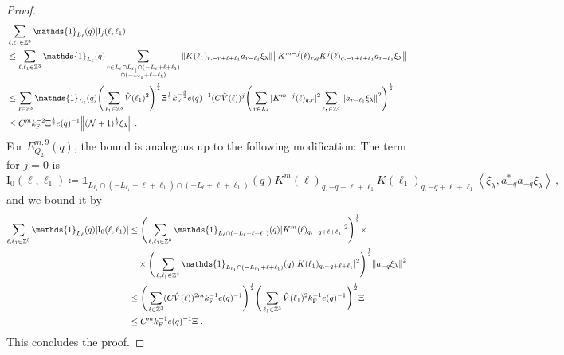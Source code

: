 \documentclass[12pt,a4paper]{article}
\numberwithin{equation}{section}
\newcommand{\1}{\mathbb{I}}
\newcommand{\F}{\mathrm{F}}
\newcommand{\I}{\mathrm{I}}
\newcommand{\kF}{k_\F}
\newcommand{\Zstar}{\mathbb{Z}^3} %
\newcommand{\Z}{\mathbb{Z}}
\newcommand{\NN}{\mathcal{N}}
\newcommand{\half}{\frac{1}{2}}
\newcommand{\eva}[1]{\left\langle #1 \right\rangle}
\theoremstyle{plain}
\theoremstyle{definition}
\theoremstyle{remark}
\theoremstyle{plain}
\theoremstyle{definition}
\theoremstyle{remark}
\begin{document}
\begin{proof}
\begin{align}
	&\sum_{\ell,\ell_1 \in \Zstar} \mathds{1}_{L_\ell}(q) |\I_j(\ell, \ell_1)| \nonumber\\
	&\leq \sum_{\ell,\ell_1 \in \Zstar} \mathds{1}_{L_\ell}(q) \sum\limits_{\substack{r\in L_{\ell} \cap L_{\ell_1} \cap (-L_{\ell}+\ell+\ell_1) \\ \cap (-L_{\ell_1}+\ell+\ell_1)}} \norm{ K(\ell_1)_{r,-r+\ell+\ell_1} a_{r-\ell_1} \xi_\lambda} \norm{ K^{m-j}(\ell)_{r,q} K^j(\ell)_{q,-r+\ell+\ell_1} a_{r-\ell_1} \xi_\lambda} \nonumber\\
	&\leq \sum_{\ell \in \Zstar} \mathds{1}_{L_\ell}(q)
		\Bigg( \sum_{\ell_1 \in \Zstar} \hat{V}(\ell_1)^2 \Bigg)^{\half}
		\Xi^{\half} \kF^{-\frac 32} e(q)^{-1} (C \hat{V}(\ell))^j
		\Bigg( \sum_{r \in L_{\ell}} |K^{m-j}(\ell)_{q,r}|^2 
		\sum_{\ell_1 \in \Z^3} \norm{a_{r-\ell_1} \xi_\lambda}^2 \Bigg)^{\half} \nonumber\\
	&\leq C^m \kF^{-2} \Xi^{\half} e(q)^{-1} \norm{(\NN+1)^{\half} \xi_\lambda} \;. \label{eq:estEQ2182}
\end{align}
For $ E^{m,9}_{Q_2}(q) $, the bound is analogous up to the following modification: The term for $ j = 0 $ is
\begin{equation}
	\I_0(\ell,\ell_1)
	\coloneq \mathds{1}_{L_{\ell_1} \cap (-L_{\ell_1} + \ell+\ell_1) \cap (-L_\ell + \ell+\ell_1)}(q)
		K^m(\ell)_{q,-q+\ell+\ell_1}
		K(\ell_1)_{q,-q+\ell+\ell_1}
		\eva{\xi_\lambda, a_{-q}^* a_{-q} \xi_\lambda} \,,
\end{equation}
and we bound it by
\begin{align}
	\sum_{\ell,\ell_1 \in \Zstar} \mathds{1}_{L_\ell}(q) |\I_0(\ell,\ell_1)|
	&\leq \Bigg( \sum_{\ell, \ell_1 \in \Zstar} \mathds{1}_{L_\ell \cap (-L_\ell + \ell+\ell_1)}(q) |K^m(\ell)_{q,-q+\ell+\ell_1}|^2 \Bigg)^{\half} \times \nonumber\\
	&\quad \times \Bigg( \sum_{\ell, \ell_1 \in \Zstar} \mathds{1}_{L_{\ell_1} \cap (-L_{\ell_1} + \ell+\ell_1)}(q) |K(\ell_1)_{q,-q+\ell+\ell_1}|^2 \Bigg)^{\half}
	\norm{ a_{-q} \xi_\lambda }^2 \nonumber\\
	&\leq \Bigg( \sum_{\ell\in \Zstar} (C \hat{V}(\ell))^{2m} \kF^{-1} e(q)^{-1} \Bigg)^{\half}
		\Bigg( \sum_{\ell_1 \in \Zstar} \hat{V}(\ell_1)^2 \kF^{-1} e(q)^{-1} \Bigg)^{\half}
	\Xi \nonumber\\
	&\leq C^m
		\kF^{-1} e(q)^{-1} \Xi \;.\label{eq:estEQ2181_bis}
\end{align}
This concludes the proof.
\end{proof}
\end{document}
